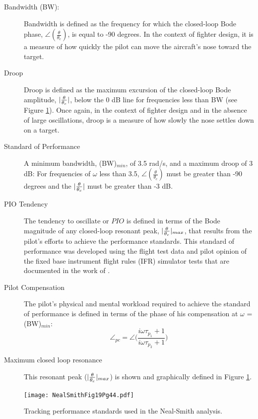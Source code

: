 \documentclass{report}
\begin{document}
\begin{description}
	\item[Bandwidth (BW):]  Bandwidth is defined as the frequency for which the closed-loop Bode phase, $\angle(\frac{\theta}{\theta_c})$, is equal to -90 degrees.  In the context of fighter design, it is a measure of how quickly the pilot can move the aircraft's nose toward the target.
	\item[Droop]  Droop is defined as the maximum excursion of the closed-loop Bode amplitude, $\arrowvert \frac{\theta}{\theta_c} \arrowvert$, below the 0 dB line for frequencies less than BW (see Figure \ref{Fig: NealSmithFig19Pg44}).  Once again, in the context of fighter design and in the absence of large oscillations, droop is a measure of how slowly the nose settles down on a target.
	\item[Standard of Performance]  A minimum bandwidth, (BW)$_{min}$, of 3.5 rad/s, and a maximum droop of 3 dB:  For frequencies of $\omega$ less than 3.5, $\angle(\frac{\theta}{\theta_c})$ must be greater than -90 degrees and the $\arrowvert \frac{\theta}{\theta_c} \arrowvert$ must be greater than -3 dB.
	\item[PIO Tendency]  The tendency to oscillate or $PIO$ is defined in terms of the Bode magnitude of any closed-loop resonant peak, $\arrowvert \frac{\theta}{\theta_c} \arrowvert_{max}$, that results from the pilot's efforts to achieve the performance standards.  This standard of performance was developed using the flight test data and pilot opinion of the fixed base instrument flight rules (IFR) simulator tests that are documented in the work of \cite{NealSmith}.
	\item[Pilot Compensation]  The pilot's physical and mental workload required to achieve the standard of performance is defined in terms of the phase of his compensation at $\omega$ =(BW)$_{min}$:
	\begin{equation}
		\angle_{pc} = \angle \Big( \frac{i\omega \tau_{p_1} + 1}{i\omega \tau_{p_2} + 1} \Big)
	\end{equation}
	\item[Maximum closed loop resonance] This resonant peak ($\arrowvert \frac{\theta}{\theta_c} \arrowvert _{max}$) is shown and graphically defined in Figure \ref{Fig: NealSmithFig19Pg44}.
\end{description}

\begin{figure}[htb]
	\begin{center}
		\texttt{[image: NealSmithFig19Pg44.pdf]}
	\end{center}
	\caption{Tracking performance standards used in the \mbox{Neal-Smith} analysis.}
	\label{Fig: NealSmithFig19Pg44}
\end{figure}
\end{document}
